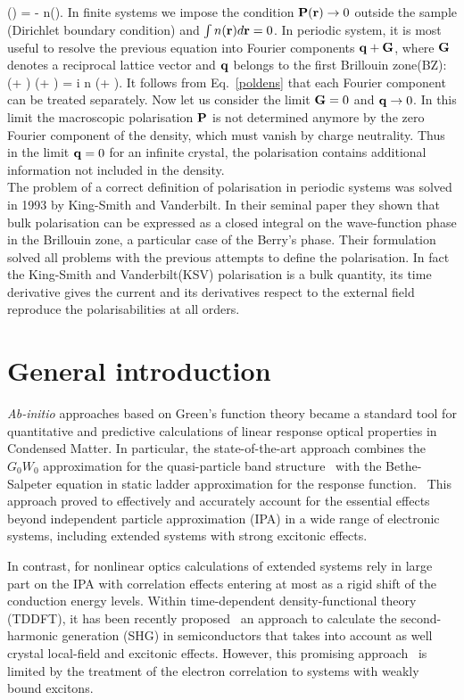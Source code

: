 \nabla \cdot \PP(\rr) = - n(\rr).
\ee                              
In finite systems we impose the condition  ${\bf P}({\bf r}) \rightarrow 0 $ outside the sample (Dirichlet boundary condition) and $\int n({\bf r}) d{\bf r}=0$.
In periodic system, it is most useful to resolve the previous equation into Fourier components ${\bf q}+ {\bf G}$,
where ${\bf G}$ denotes a reciprocal lattice vector and ${\bf q}$ belongs to the first Brillouin zone(BZ):
\be
(\qq + \GG) \cdot \PP(\qq + \GG) = i n (\qq + \GG).
\label{poldens}
\ee
It follows from Eq.~\ref{poldens} that each Fourier component can be treated separately. Now let us consider the limit ${\bf G}=0$ and ${\bf q} \rightarrow 0$. In this limit  the macroscopic polarisation ${\bf P}$ is not determined anymore by the zero Fourier component of the density, which must vanish by charge neutrality.  Thus in the limit ${\bf q} = 0$ for an infinite crystal, the polarisation contains additional information not included in the density.\cite{Martin1998} \\
The problem of a correct definition of polarisation in periodic systems was solved in 1993 by  King-Smith and Vanderbilt.\cite{KSV1} In their seminal paper they shown that  bulk polarisation can be expressed as a closed integral on the wave-function phase in the Brillouin zone, a particular case of the Berry's phase. Their formulation solved all problems with the previous attempts to define the polarisation. In fact the King-Smith and Vanderbilt(KSV) polarisation is a bulk quantity, its time derivative gives the current and its derivatives respect to the external field reproduce the polarisabilities at all orders.\\
\section{General introduction}
\emph{Ab-initio} approaches based on Green's function theory became a standard tool for quantitative and predictive calculations of linear response optical properties in Condensed Matter. In particular, the state-of-the-art approach combines the $G_0W_0$ approximation for the quasi-particle band structure~\cite{aryasetiawan1998gw} with the Bethe-Salpeter equation in static ladder approximation for the response function.~\cite{strinati} This approach proved to effectively and accurately account for the essential effects beyond independent particle approximation (IPA) in a wide range of electronic systems, including extended systems with strong excitonic effects.~\cite{Onida}

In contrast, for nonlinear optics \ai calculations of extended systems rely in large part on the IPA\cite{PhysRevB.48.11705} with correlation effects entering at most as a rigid shift of the conduction energy levels\cite{PhysRevB.80.155205}.  Within time-dependent density-functional theory (TDDFT), it has been recently proposed~\cite{PhysRevB.82.235201} an approach to calculate the second-harmonic generation (SHG) in semiconductors that takes into account as well crystal local-field and excitonic effects. However, this promising approach~\cite{Cazzanelli2012} is limited by the treatment of the electron correlation to systems with weakly bound excitons.~\cite{LRC} 

